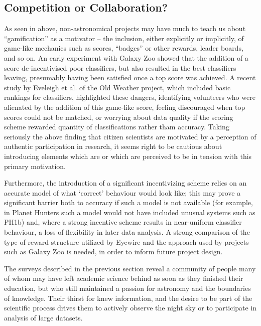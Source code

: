\documentclass{ar2e}
\begin{document}



\subsection{Competition or Collaboration?}
\label{sec:crowd:gamification}

As seen in  above, non-astronomical projects may have
much to teach us about ``gamification'' as a motivator -- the inclusion, either
explicitly or implicitly, of game-like mechanics such as scores, ``badges'' or
other rewards, leader boards, and so on. An early experiment with Galaxy Zoo
showed that the addition of a score de-incentivised poor classifiers, but also
resulted in the best classifiers leaving, presumably having been satisfied once
a top score was achieved. A recent study by Eveleigh et al. of the Old Weather
project, which included basic rankings for classifiers, highlighted these
dangers, identifying volunteers who were alienated by the addition of this
game-like score, feeling discouraged when top scores could not be matched, or
worrying about data quality if the scoring scheme rewarded quantity of
classifications rather tham accuracy. Taking seriously the above finding 
that citizen scientists are motivated by a perception of authentic
participation in research, it seems right to be cautious about introducing
elements which are or which are perceived to be in tension with this primary
motivation. 

Furthermore, the introduction of a significant incentivizing scheme relies on an
accurate model of what `correct' behaviour would look like; this may prove a
significant barrier both to accuracy if such a model is not available (for
example, in Planet Hunters such a model would not have included unusual systems
such as PH1b) and, where a strong incentive scheme results in near-uniform
classifier behaviour, a loss of flexibility in later data analysis. 
A strong comparison of the type of reward structure utilized by Eyewire and the
approach used by projects such as Galaxy Zoo is needed, in order to
inform future project design. 

The surveys described in the previous section reveal a community of people many
of whom may have left   academic science behind as soon as they finished their 
education, but who still maintained a passion for astronomy and the  boundaries
of knowledge.  Their thirst for knew information, and the  desire to be part of
the  scientific process drives them to actively observe the  night sky or to
participate in analysis of large datasets.  
\end{document}
